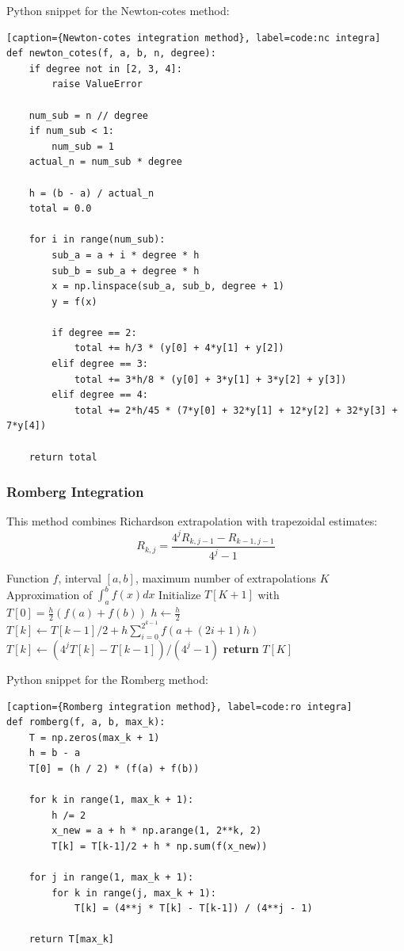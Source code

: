 \documentclass[10pt]{article}
\begin{document}
Python snippet for the Newton-cotes method:
\begin{lstlisting}[style=custompython][caption={Newton-cotes integration method}, label=code:nc integra]
def newton_cotes(f, a, b, n, degree):
    if degree not in [2, 3, 4]:
        raise ValueError
    
    num_sub = n // degree
    if num_sub < 1:
        num_sub = 1
    actual_n = num_sub * degree
    
    h = (b - a) / actual_n
    total = 0.0
    
    for i in range(num_sub):
        sub_a = a + i * degree * h
        sub_b = sub_a + degree * h
        x = np.linspace(sub_a, sub_b, degree + 1)
        y = f(x)
        
        if degree == 2:
            total += h/3 * (y[0] + 4*y[1] + y[2])
        elif degree == 3: 
            total += 3*h/8 * (y[0] + 3*y[1] + 3*y[2] + y[3])
        elif degree == 4: 
            total += 2*h/45 * (7*y[0] + 32*y[1] + 12*y[2] + 32*y[3] + 7*y[4])
    
    return total
\end{lstlisting}

\subsubsection{Romberg Integration}
This method combines Richardson extrapolation with trapezoidal estimates:
\begin{equation}
R_{k,j} = \frac{4^j R_{k,j-1} - R_{k-1,j-1}}{4^j - 1}
\end{equation}

\begin{algorithm}[H]
\caption{Romberg Integration}
\begin{algorithmic}[1]
\Require Function $f$, interval $[a, b]$, maximum number of extrapolations $K$
\Ensure Approximation of $\int_{a}^{b} f(x) dx$
\State Initialize $T[K+1]$ with $T[0] = \frac{h}{2} (f(a) + f(b))$
    \State $h \gets \frac{h}{2}$
    \State $T[k] \gets T[k-1]/2 + h \sum_{i=0}^{2^{k-1}} f(a + (2i + 1)h)$
        \State $T[k] \gets (4^{j}T[k] - T[k-1])/(4^{j} - 1)$
    \EndFor
\EndFor
\State \textbf{return} $T[K]$
\end{algorithmic}
\end{algorithm}
Python snippet for the Romberg method:
\begin{lstlisting}[style=custompython][caption={Romberg integration method}, label=code:ro integra]
def romberg(f, a, b, max_k):
    T = np.zeros(max_k + 1)
    h = b - a
    T[0] = (h / 2) * (f(a) + f(b))
    
    for k in range(1, max_k + 1):
        h /= 2
        x_new = a + h * np.arange(1, 2**k, 2)
        T[k] = T[k-1]/2 + h * np.sum(f(x_new))
    
    for j in range(1, max_k + 1):
        for k in range(j, max_k + 1):
            T[k] = (4**j * T[k] - T[k-1]) / (4**j - 1)
    
    return T[max_k]
\end{lstlisting}
\end{document}
